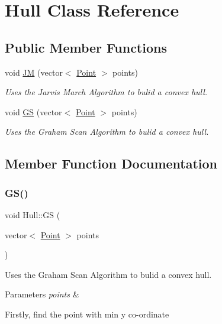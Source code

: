 \hypertarget{classHull}{}\section{Hull Class Reference}
\label{classHull}
\subsection*{Public Member Functions}
\begin{DoxyCompactItemize}
\item 
void \hyperlink{classHull_ac157f37a1bb8197570e16ad151d39f11}{JM} (vector$<$ \hyperlink{classPoint}{Point} $>$ points)
\begin{DoxyCompactList}\small\item\em Uses the Jarvis March Algorithm to bulid a convex hull. \end{DoxyCompactList}\item 
void \hyperlink{classHull_a522f1506c8bb7285cba587bd41bf30eb}{GS} (vector$<$ \hyperlink{classPoint}{Point} $>$ points)
\begin{DoxyCompactList}\small\item\em Uses the Graham Scan Algorithm to bulid a convex hull. \end{DoxyCompactList}\end{DoxyCompactItemize}


\subsection{Member Function Documentation}
\mbox{\label{classHull_a522f1506c8bb7285cba587bd41bf30eb}} 
\subsubsection{\texorpdfstring{G\+S()}{GS()}}
{\footnotesize\ttfamily void Hull\+::\+GS (\begin{DoxyParamCaption}\item[{vector$<$ \hyperlink{classPoint}{Point} $>$}]{points }\end{DoxyParamCaption})}



Uses the Graham Scan Algorithm to bulid a convex hull. 


\begin{DoxyParams}{Parameters}
{\em points} & \\
\hline
\end{DoxyParams}
Firstly, find the point with min y co-\/ordinate

